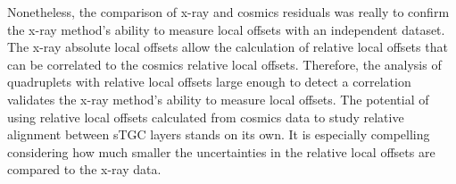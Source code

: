 Nonetheless, the comparison of x-ray and cosmics residuals was really to confirm the x-ray method's ability to measure local offsets with an independent dataset. The x-ray absolute local offsets allow the calculation of relative local offsets that can be correlated to the cosmics relative local offsets. Therefore, the analysis of quadruplets with relative local offsets large enough to detect a correlation validates the x-ray method's ability to measure local offsets. The potential of using relative local offsets calculated from cosmics data to study relative alignment between sTGC layers stands on its own. It is especially compelling considering how much smaller the uncertainties in the relative local offsets are compared to the x-ray data.